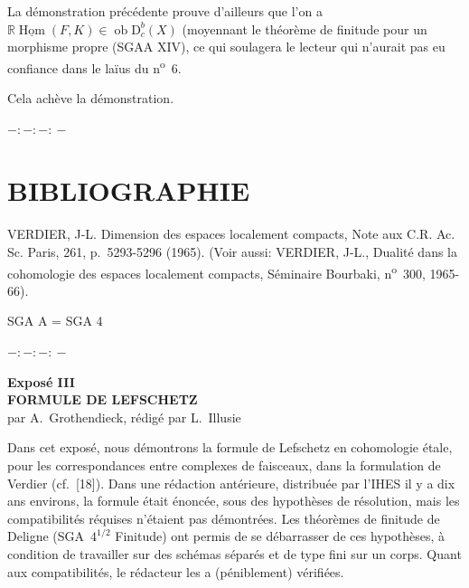\documentclass[11pt]{article}
\DeclareMathOperator{\Hom}{Hom}
\newcommand{\R}{\mathbb{R}}\newcommand{\RHomCore}{\mathbb{R}\mathrm{Hom}}
\newcommand{\D}{\mathrm{D}}
\newcommand{\ob}{\operatorname{ob}}
\providecommand{\RHom}{\RHomCore}
\providecommand{\uRHom}{\underline{\RHom}}
\providecommand{\RHom}{\RHomCore}
\providecommand{\Hom}{\operatorname{Hom}}
\providecommand{\ob}{\operatorname{ob}}
\providecommand{\RHom}{\R\mathcal{H}om}
\providecommand{\R}{\mathrm R}
\providecommand{\RHom}{\RHomCore}
\providecommand{\Hom}{\operatorname{Hom}}
\begin{document}
La démonstration précédente prouve d'ailleurs que l'on a $\R\underline{\Hom}(F,K)\in\ob\D_c^b(X)$ (moyennant le théorème de finitude pour un morphisme propre (SGAA XIV), ce qui soulagera le lecteur qui n'aurait pas eu confiance dans le laïus du n\textsuperscript{o}~6.

Cela achève la démonstration.

\begin{center}
$-:\!-:\!-:\!-$
\end{center}

\section*{BIBLIOGRAPHIE}

\begin{enumerate}[label={[\arabic*]}]
\item VERDIER, J-L. Dimension des espaces localement compacts, Note aux C.R. Ac. Sc. Paris, 261, p.~5293-5296 (1965). (Voir aussi: VERDIER, J-L., Dualité dans la cohomologie des espaces localement compacts, Séminaire Bourbaki, n\textsuperscript{o}~300, 1965-66).
\end{enumerate}

SGA A = SGA 4

\begin{center}
$-:\!-:\!-:\!-$
\end{center}

\clearpage
\begin{center}
{\Large \textbf{Exposé III}}\\[0.4em]
{\large \textbf{FORMULE DE LEFSCHETZ}}\\[0.3em]
par A.~Grothendieck, rédigé par L.~Illusie
\end{center}
\renewenvironment{statement}[1]{\par\medskip\noindent\textbf{#1}\ }{\par\medskip}
\renewenvironment{prooftext}[1][Proof]{\par\noindent\emph{#1}\ }{\par\medskip}
\renewcommand{\R}{\mathrm{R}}
\renewcommand{\uRHom}{\mathrm{R}\underline{\mathrm{Hom}}}

Dans cet exposé, nous démontrons la formule de Lefschetz en cohomologie étale, pour les correspondances entre complexes de faisceaux, dans la formulation de Verdier (cf.~[18]). Dans une rédaction antérieure, distribuée par l'IHES il y a dix ans environs, la formule était énoncée, sous des hypothèses de résolution, mais les compatibilités réquises n'étaient pas démontrées. Les théorèmes de finitude de Deligne (SGA~$4^{1/2}$ Finitude) ont permis de se débarrasser de ces hypothèses, à condition de travailler sur des schémas séparés et de type fini sur un corps. Quant aux compatibilités, le rédacteur les a (péniblement) vérifiées.
\end{document}
